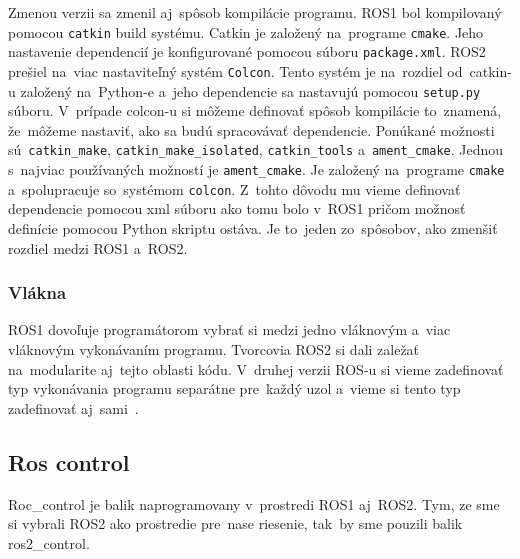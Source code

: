 	Zmenou verzii sa zmenil aj~spôsob kompilácie programu. ROS1 bol kompilovaný pomocou \texttt{catkin} build systému. Catkin je založený
	na~programe \texttt{cmake}. Jeho nastavenie dependencií je konfigurované pomocou súboru \texttt{package.xml}. ROS2 prešiel na~viac
	nastaviteľný systém \texttt{Colcon}. Tento systém je na~rozdiel od~catkin-u založený na~Python-e a~jeho dependencie sa nastavujú pomocou
	\texttt{setup.py} súboru. V~prípade colcon-u si môžeme definovať spôsob kompilácie to~znamená, že~môžeme nastaviť, ako sa budú spracovávať
	dependencie. Ponúkané možnosti sú~\texttt{catkin\_make}, \texttt{catkin\_make\_isolated}, \texttt{catkin\_tools} a~\texttt{ament\_cmake}.
	Jednou s~najviac používaných možností je \texttt{ament\_cmake}. Je založený na~programe \texttt{cmake} a~spolupracuje so~systémom \texttt{colcon}.
	Z~tohto dôvodu mu vieme definovať dependencie pomocou xml súboru ako tomu bolo v~ROS1 pričom možnosť definície pomocou Python skriptu ostáva.
	Je to~jeden zo~spôsobov, ako zmenšiť rozdiel medzi ROS1 a~ROS2.

\subsubsection{Vlákna}

	ROS1 dovoľuje programátorom vybrať si medzi jedno vláknovým a~viac vláknovým vykonávaním programu. Tvorcovia ROS2 si dali zaležať na~modularite
	aj~tejto oblasti kódu. V~druhej verzii ROS-u si vieme zadefinovať typ vykonávania programu separátne pre~každý uzol a~vieme si tento typ
	zadefinovať aj~sami~\cite{ROS2design}.

\subsection{Ros control}
\label{subsec:roscontrol}

Roc\_control je balik naprogramovany v~prostredi ROS1 aj~ROS2. Tym, ze sme si vybrali ROS2 ako prostredie pre~nase riesenie,
tak~by sme pouzili balik ros2\_control.

